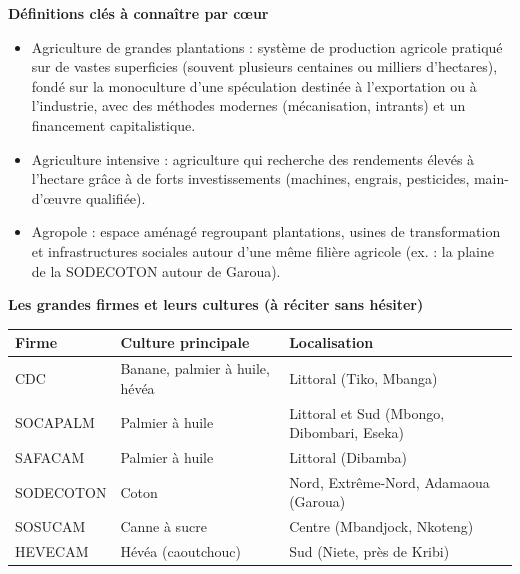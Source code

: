 \documentclass[11pt]{article}
\newcommand{\cle}[1]{{\popxbold\color{popdark}#1}}
\begin{document}
\begin{bilan}
\textbf{Définitions clés à connaître par cœur}
\begin{itemize}
  \item \cle{Agriculture de grandes plantations} : système de production agricole pratiqué sur de vastes superficies (souvent plusieurs centaines ou milliers d'hectares), fondé sur la \cle{monoculture} d'une spéculation destinée à l'exportation ou à l'industrie, avec des méthodes modernes (mécanisation, intrants) et un financement capitalistique.
  \item \cle{Agriculture intensive} : agriculture qui recherche des rendements élevés à l'hectare grâce à de forts investissements (machines, engrais, pesticides, main-d'œuvre qualifiée).
  \item \cle{Agropole} : espace aménagé regroupant plantations, usines de transformation et infrastructures sociales autour d'une même filière agricole (ex. : la plaine de la SODECOTON autour de Garoua).
\end{itemize}

\textbf{Les grandes firmes et leurs cultures (à réciter sans hésiter)}
\begin{center}
\begin{tabularx}{\linewidth}{|l|X|X|}\hline
\rowcolor{popblueL} \textbf{Firme} & \textbf{Culture principale} & \textbf{Localisation} \\ \hline
CDC & Banane, palmier à huile, hévéa & Littoral (Tiko, Mbanga) \\ \hline
SOCAPALM & Palmier à huile & Littoral et Sud (Mbongo, Dibombari, Eseka) \\ \hline
SAFACAM & Palmier à huile & Littoral (Dibamba) \\ \hline
SODECOTON & Coton & Nord, Extrême-Nord, Adamaoua (Garoua) \\ \hline
SOSUCAM & Canne à sucre & Centre (Mbandjock, Nkoteng) \\ \hline
HEVECAM & Hévéa (caoutchouc) & Sud (Niete, près de Kribi) \\ \hline
\end{tabularx}
\end{center}


\end{bilan}
\end{document}
